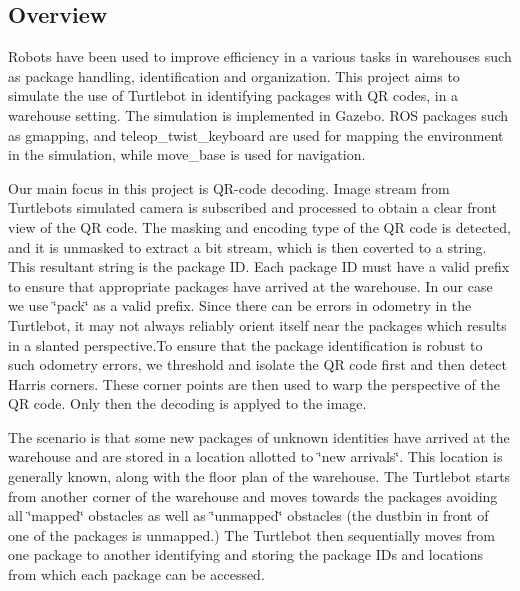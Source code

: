 \href{https://travis-ci.org/Mayavan/Package_Identification_using_Turtlebot}{\tt }

\href{https://coveralls.io/github/Mayavan/Package_Identification_using_Turtlebot?branch=master}{\tt }

\href{https://opensource.org/licenses/BSD-3-Clause}{\tt }

\subsection*{Overview}

Robots have been used to improve efficiency in a various tasks in warehouses such as package handling, identification and organization. This project aims to simulate the use of Turtlebot in identifying packages with QR codes, in a warehouse setting. The simulation is implemented in Gazebo. R\+OS packages such as gmapping, and teleop\+\_\+twist\+\_\+keyboard are used for mapping the environment in the simulation, while move\+\_\+base is used for navigation.

 

Our main focus in this project is Q\+R-\/code decoding. Image stream from Turtlebot\textquotesingle{}s simulated camera is subscribed and processed to obtain a clear front view of the QR code. The masking and encoding type of the QR code is detected, and it is unmasked to extract a bit stream, which is then coverted to a string. This resultant string is the package ID. Each package ID must have a valid prefix to ensure that appropriate packages have arrived at the warehouse. In our case we use \char`\"{}pack\char`\"{} as a valid prefix. Since there can be errors in odometry in the Turtlebot, it may not always reliably orient itself near the packages which results in a slanted perspective.\+To ensure that the package identification is robust to such odometry errors, we threshold and isolate the QR code first and then detect Harris corners. These corner points are then used to warp the perspective of the QR code. Only then the decoding is applyed to the image.

 

The scenario is that some new packages of unknown identities have arrived at the warehouse and are stored in a location allotted to \char`\"{}new arrivals\char`\"{}. This location is generally known, along with the floor plan of the warehouse. The Turtlebot starts from another corner of the warehouse and moves towards the packages avoiding all \char`\"{}mapped\char`\"{} obstacles as well as \char`\"{}unmapped\char`\"{} obstacles (the dustbin in front of one of the packages is unmapped.) The Turtlebot then sequentially moves from one package to another identifying and storing the package I\+Ds and locations from which each package can be accessed.

